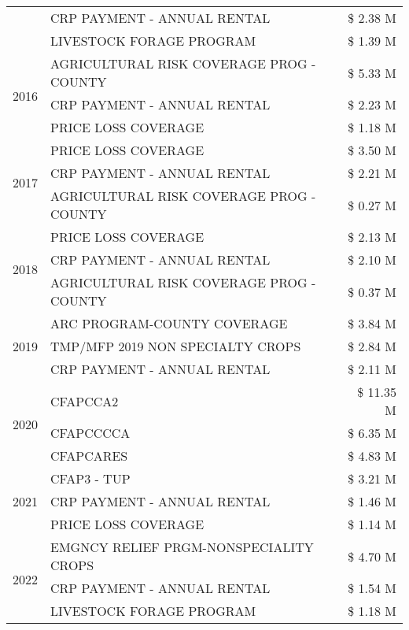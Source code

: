 \begin{tabular}{llr}
 & CRP PAYMENT - ANNUAL RENTAL & \$ 2.38 M \\
 & LIVESTOCK FORAGE PROGRAM & \$ 1.39 M \\
\cline{1-3}
\multirow[t]{3}{*}{2016} & AGRICULTURAL RISK COVERAGE PROG - COUNTY & \$ 5.33 M \\
 & CRP PAYMENT - ANNUAL RENTAL & \$ 2.23 M \\
 & PRICE LOSS COVERAGE & \$ 1.18 M \\
\cline{1-3}
\multirow[t]{3}{*}{2017} & PRICE LOSS COVERAGE & \$ 3.50 M \\
 & CRP PAYMENT - ANNUAL RENTAL & \$ 2.21 M \\
 & AGRICULTURAL RISK COVERAGE PROG - COUNTY & \$ 0.27 M \\
\cline{1-3}
\multirow[t]{3}{*}{2018} & PRICE LOSS COVERAGE & \$ 2.13 M \\
 & CRP PAYMENT - ANNUAL RENTAL & \$ 2.10 M \\
 & AGRICULTURAL RISK COVERAGE PROG - COUNTY & \$ 0.37 M \\
\cline{1-3}
\multirow[t]{3}{*}{2019} & ARC PROGRAM-COUNTY COVERAGE & \$ 3.84 M \\
 & TMP/MFP 2019 NON SPECIALTY CROPS & \$ 2.84 M \\
 & CRP PAYMENT - ANNUAL RENTAL & \$ 2.11 M \\
\cline{1-3}
\multirow[t]{3}{*}{2020} & CFAPCCA2 & \$ 11.35 M \\
 & CFAPCCCCA & \$ 6.35 M \\
 & CFAPCARES & \$ 4.83 M \\
\cline{1-3}
\multirow[t]{3}{*}{2021} & CFAP3 - TUP & \$ 3.21 M \\
 & CRP PAYMENT - ANNUAL RENTAL & \$ 1.46 M \\
 & PRICE LOSS COVERAGE & \$ 1.14 M \\
\cline{1-3}
\multirow[t]{3}{*}{2022} & EMGNCY RELIEF PRGM-NONSPECIALITY CROPS & \$ 4.70 M \\
 & CRP PAYMENT - ANNUAL RENTAL & \$ 1.54 M \\
 & LIVESTOCK FORAGE PROGRAM & \$ 1.18 M \\
\cline{1-3}
\bottomrule
\end{tabular}
